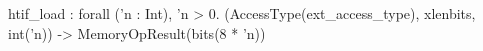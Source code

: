 htif_load : forall ('n : Int), 'n > 0. (AccessType(ext_access_type), xlenbits, int('n)) -> MemoryOpResult(bits(8 * 'n))
